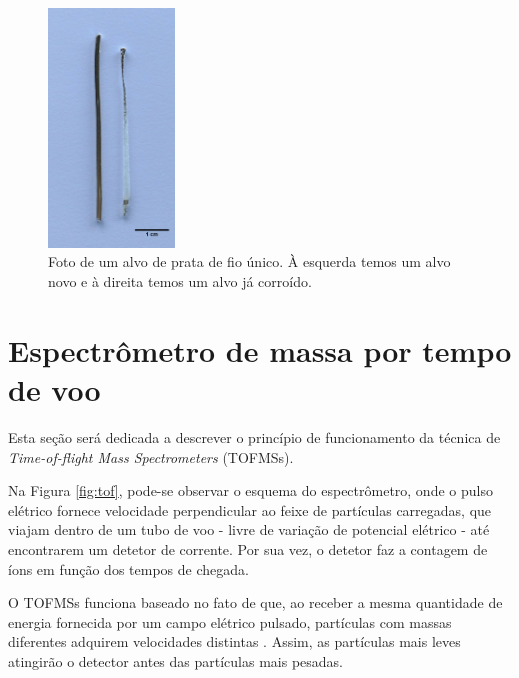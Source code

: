 \begin{figure}
  \centering
  \includegraphics[width=0.3\textwidth]{images/foca/alvo}
  \caption{ Foto de um alvo de prata de fio único. À esquerda temos um alvo novo e à direita temos um alvo já corroído.  }
  \label{fig:alvo}
\end{figure}






\section{Espectrômetro de massa por tempo de voo}

Esta seção será dedicada a descrever o princípio de funcionamento da técnica de \textit{Time-of-flight Mass Spectrometers} (TOFMSs).

Na Figura \ref{fig:tof}, pode-se observar o esquema do espectrômetro, onde o pulso elétrico fornece velocidade perpendicular ao feixe de partículas carregadas, que viajam dentro de um tubo de voo - livre de variação de potencial elétrico - até encontrarem um detetor de corrente. Por sua vez, o detetor faz a contagem de íons em função dos tempos de chegada.

O TOFMSs funciona  baseado no fato de que, ao receber a mesma quantidade de energia fornecida por um campo elétrico pulsado, partículas com massas diferentes adquirem velocidades distintas \cite{dissertacao_kevin}. Assim, as partículas mais leves atingirão o detector antes das partículas mais pesadas.

